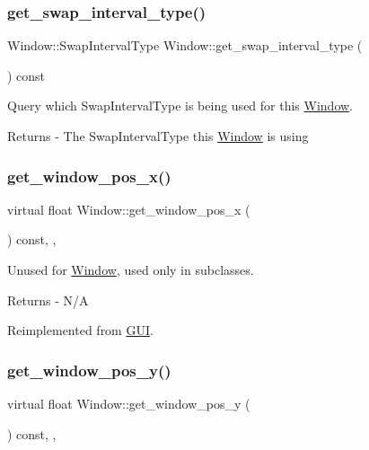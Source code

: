 \subsubsection{\texorpdfstring{get\+\_\+swap\+\_\+interval\+\_\+type()}{get\_swap\_interval\_type()}}
{\footnotesize\ttfamily Window\+::\+Swap\+Interval\+Type Window\+::get\+\_\+swap\+\_\+interval\+\_\+type (\begin{DoxyParamCaption}{ }\end{DoxyParamCaption}) const}

Query which Swap\+Interval\+Type is being used for this \mbox{\hyperlink{class_window}{Window}}. \begin{DoxyReturn}{Returns}
-\/ The Swap\+Interval\+Type this \mbox{\hyperlink{class_window}{Window}} is using 
\end{DoxyReturn}
\mbox{\label{class_window_ab2af2ee909ac87876fd043acfe7611ca}} 
\subsubsection{\texorpdfstring{get\+\_\+window\+\_\+pos\+\_\+x()}{get\_window\_pos\_x()}}
{\footnotesize\ttfamily virtual float Window\+::get\+\_\+window\+\_\+pos\+\_\+x (\begin{DoxyParamCaption}{ }\end{DoxyParamCaption}) const\hspace{0.3cm}{\ttfamily [inline]}, {\ttfamily [override]}, {\ttfamily [virtual]}}

Unused for \mbox{\hyperlink{class_window}{Window}}, used only in subclasses. \begin{DoxyReturn}{Returns}
-\/ N/A 
\end{DoxyReturn}


Reimplemented from \mbox{\hyperlink{class_g_u_i_abbad56adda65a7176a4e0c7e260d9449}{G\+UI}}.

\mbox{\label{class_window_a950ef0cfbccf484315041162942c4ecc}} 
\subsubsection{\texorpdfstring{get\+\_\+window\+\_\+pos\+\_\+y()}{get\_window\_pos\_y()}}
{\footnotesize\ttfamily virtual float Window\+::get\+\_\+window\+\_\+pos\+\_\+y (\begin{DoxyParamCaption}{ }\end{DoxyParamCaption}) const\hspace{0.3cm}{\ttfamily [inline]}, {\ttfamily [override]}, {\ttfamily [virtual]}}

